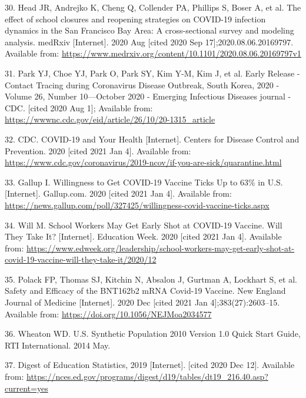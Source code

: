 \documentclass[
]{article}
\begin{document}
\leavevmode\hypertarget{ref-head_effect_2020}{}%
30. Head JR, Andrejko K, Cheng Q, Collender PA, Phillips S, Boser A, et
al. The effect of school closures and reopening strategies on COVID-19
infection dynamics in the San Francisco Bay Area: A cross-sectional
survey and modeling analysis. medRxiv {[}Internet{]}. 2020 Aug {[}cited
2020 Sep 17{]};2020.08.06.20169797. Available from:
\url{https://www.medrxiv.org/content/10.1101/2020.08.06.20169797v1}

\leavevmode\hypertarget{ref-park_early_nodate}{}%
31. Park YJ, Choe YJ, Park O, Park SY, Kim Y-M, Kim J, et al. Early
Release - Contact Tracing during Coronavirus Disease Outbreak, South
Korea, 2020 - Volume 26, Number 10---October 2020 - Emerging Infectious
Diseases journal - CDC. {[}cited 2020 Aug 1{]}; Available from:
\url{https://wwwnc.cdc.gov/eid/article/26/10/20-1315_article}

\leavevmode\hypertarget{ref-cdc_covid-19_2020}{}%
32. CDC. COVID-19 and Your Health {[}Internet{]}. Centers for Disease
Control and Prevention. 2020 {[}cited 2021 Jan 4{]}. Available from:
\url{https://www.cdc.gov/coronavirus/2019-ncov/if-you-are-sick/quarantine.html}

\leavevmode\hypertarget{ref-gallup_inc_willingness_2020}{}%
33. Gallup I. Willingness to Get COVID-19 Vaccine Ticks Up to 63\% in
U.S. {[}Internet{]}. Gallup.com. 2020 {[}cited 2021 Jan 4{]}. Available
from:
\url{https://news.gallup.com/poll/327425/willingness-covid-vaccine-ticks.aspx}

\leavevmode\hypertarget{ref-will_school_2020}{}%
34. Will M. School Workers May Get Early Shot at COVID-19 Vaccine. Will
They Take It? {[}Internet{]}. Education Week. 2020 {[}cited 2021 Jan
4{]}. Available from:
\url{https://www.edweek.org/leadership/school-workers-may-get-early-shot-at-covid-19-vaccine-will-they-take-it/2020/12}

\leavevmode\hypertarget{ref-polack_safety_2020}{}%
35. Polack FP, Thomas SJ, Kitchin N, Absalon J, Gurtman A, Lockhart S,
et al. Safety and Efficacy of the BNT162b2 mRNA Covid-19 Vaccine. New
England Journal of Medicine {[}Internet{]}. 2020 Dec {[}cited 2021 Jan
4{]};383(27):2603--15. Available from:
\url{https://doi.org/10.1056/NEJMoa2034577}

\leavevmode\hypertarget{ref-wheaton_us_2014}{}%
36. Wheaton WD. U.S. Synthetic Population 2010 Version 1.0 Quick Start
Guide, RTI International. 2014 May.

\leavevmode\hypertarget{ref-noauthor_digest_nodate}{}%
37. Digest of Education Statistics, 2019 {[}Internet{]}. {[}cited 2020
Dec 12{]}. Available from:
\url{https://nces.ed.gov/programs/digest/d19/tables/dt19_216.40.asp?current=yes}
\end{document}
